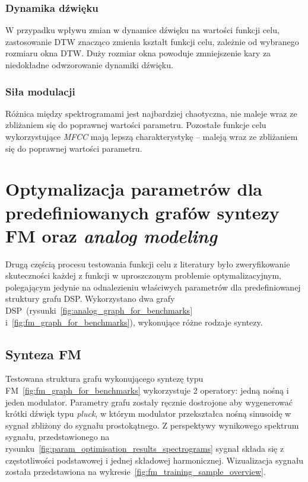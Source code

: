 \subsubsection{Dynamika dźwięku}

W przypadku wpływu zmian w dynamice dźwięku na wartości funkcji celu,
zastosowanie DTW znacząco zmienia kształt funkcji celu, zależnie od wybranego rozmiaru
okna DTW\@. Duży rozmiar okna powoduje zmniejszenie kary za niedokładne odwzorowanie
dynamiki dźwięku. 

\subsubsection{Siła modulacji}

Różnica między spektrogramami jest najbardziej chaotyczna, nie maleje wraz
ze zbliżaniem się do poprawnej wartości parametru. Pozostałe funkcje celu
wykorzystujące \textit{MFCC} mają lepszą charakterystykę -- maleją
wraz ze zbliżaniem się do poprawnej wartości parametru.

\section{Optymalizacja parametrów dla predefiniowanych
grafów syntezy FM oraz \textit{analog modeling}}

Drugą częścią procesu testowania funkcji celu z literatury było zweryfikowanie skuteczności
każdej z funkcji w uproszczonym problemie optymalizacyjnym, polegającym jedynie na odnalezieniu właściwych
parametrów dla predefiniowanej struktury grafu DSP\@. Wykorzystano dwa grafy
DSP~(rysunki~\ref{fig:analog_graph_for_benchmarks} i~\ref{fig:fm_graph_for_benchmarks}),
wykonujące różne rodzaje syntezy.

\subsection{Synteza FM}

Testowana struktura grafu wykonującego syntezę typu FM~\ref{fig:fm_graph_for_benchmarks}
wykorzystuje 2 operatory: jedną nośną
i jeden modulator. Parametry grafu zostały ręcznie dostrojone aby wygenerować krótki
dźwięk typu \textit{pluck}, w którym modulator przekształca nośną sinusoidę w sygnał zbliżony
do sygnału prostokątnego. Z perspektywy wynikowego spektrum sygnału, przedstawionego na
rysunku~\ref{fig:param_optimisation_results_spectrograms} sygnał składa się z częstotliwości
podstawowej i jednej składowej harmonicznej. Wizualizacja sygnału została przedstawiona
na wykresie~\ref{fig:fm_training_sample_overview}.

